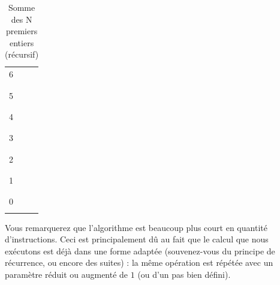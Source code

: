 \documentclass[11pt,a4paper]{article}
\begin{document}
\begin{table}[h!]
\begin{minipage}{0.24\textwidth}
\begin{tabular}{|C{1cm}|C{1cm}|C{1cm}|}
        6     &        & \\
              &        & \\
        \hline
              &        & \\
        5     &        & \\
              &        & \\
        \hline
              &        & \\
        4     &        & \\
              &        & \\
        \hline
              &        & \\
        3     &        & \\
              &        & \\
        \hline
              &        & \\
        2     &        & \\
              &        & \\
        \hline
              &        & \\
        1     &        & \\
              &        & \\
        \hline
              &        & \\
        0     &        & \\
              &        & \\
        \hline
    \end{tabular}
  \end{minipage}
  \caption{Somme des N premiers entiers (récursif)}
  \label{somme-n-premiers-entiers-recursif}
\end{table}


\bigskip

Vous remarquerez que l'algorithme est beaucoup plus court en quantité d'instructions.
Ceci est principalement dû au fait que le calcul que nous exécutons est déjà dans une forme adaptée (souvenez-vous du principe de récurrence, ou encore des suites) : la même opération est répétée avec un paramètre réduit ou augmenté de $ 1 $ (ou d'un pas bien défini).

\bigskip

\end{document}

